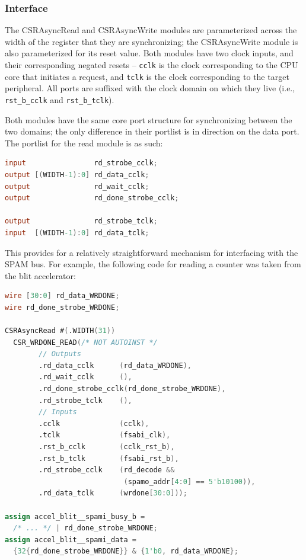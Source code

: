\documentclass[10pt]{article}
\begin{document}
\subsubsection{Interface}

The CSRAsyncRead and CSRAsyncWrite modules are parameterized across the
width of the register that they are synchronizing; the CSRAsyncWrite module
is also parameterized for its reset value.  Both modules have two clock
inputs, and their corresponding negated resets -- \texttt{cclk} is the clock
corresponding to the CPU core that initiates a request, and \texttt{tclk} is
the clock corresponding to the target peripheral.  All ports are suffixed
with the clock domain on which they live (i.e., \texttt{rst\_b\_cclk} and
\texttt{rst\_b\_tclk}).

Both modules have the same core port structure for synchronizing between the
two domains; the only difference in their portlist is in direction on the
data port. The portlist for the read module is as such:

\begin{lstlisting}[basicstyle=\footnotesize,language=Verilog]
input                rd_strobe_cclk;
output [(WIDTH-1):0] rd_data_cclk;
output               rd_wait_cclk;
output               rd_done_strobe_cclk;
 
output               rd_strobe_tclk;
input  [(WIDTH-1):0] rd_data_tclk;
\end{lstlisting}

This provides for a relatively straightforward mechanism for interfacing
with the SPAM bus. For example, the following code for reading a counter was
taken from the blit accelerator:

\begin{lstlisting}[basicstyle=\footnotesize,language=Verilog]
wire [30:0] rd_data_WRDONE;
wire rd_done_strobe_WRDONE;
 
CSRAsyncRead #(.WIDTH(31))
  CSR_WRDONE_READ(/* NOT AUTOINST */
        // Outputs
        .rd_data_cclk      (rd_data_WRDONE),
        .rd_wait_cclk      (),
        .rd_done_strobe_cclk(rd_done_strobe_WRDONE),
        .rd_strobe_tclk    (),
        // Inputs
        .cclk              (cclk),
        .tclk              (fsabi_clk),
        .rst_b_cclk        (cclk_rst_b),
        .rst_b_tclk        (fsabi_rst_b),
        .rd_strobe_cclk    (rd_decode &&
                            (spamo_addr[4:0] == 5'b10100)),
        .rd_data_tclk      (wrdone[30:0]));
 
assign accel_blit__spami_busy_b =
  /* ... */ | rd_done_strobe_WRDONE;
assign accel_blit__spami_data =
  {32{rd_done_strobe_WRDONE}} & {1'b0, rd_data_WRDONE};
\end{lstlisting}
\end{document}
